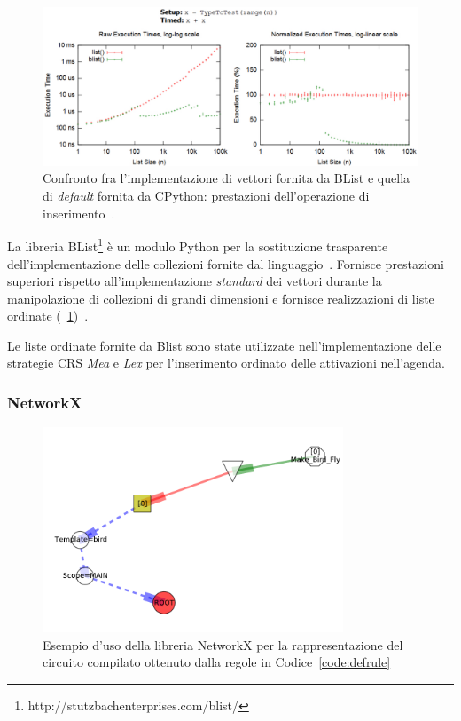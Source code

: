 \begin{figure}[h]
\centering
\includegraphics[width=1\textwidth]{Immagini/Capitolo3/BList-comparison.pdf}
\caption[Confronto fra l'implementazione di vettori fornita da BList e di \emph{default}]{Confronto fra l'implementazione di vettori fornita da BList e quella di \emph{default} fornita da CPython: prestazioni dell'operazione di inserimento~\cite{blist-prest}.}\label{fig:blist-comparison}
\end{figure}

La libreria BList\footnote{http://stutzbachenterprises.com/blist/} è un modulo Python per la sostituzione trasparente dell'implementazione delle collezioni fornite dal linguaggio~\cite{blist-manual}. Fornisce prestazioni superiori rispetto all'implementazione \emph{standard} dei vettori durante la manipolazione di collezioni di grandi dimensioni e fornisce realizzazioni di liste ordinate (\figurename~\ref{fig:blist-comparison})~\cite{blist-prest}.

Le liste ordinate fornite da Blist sono state utilizzate nell'implementazione delle strategie CRS \emph{Mea} e \emph{Lex} per l'inserimento ordinato delle attivazioni nell'agenda.


\subsubsection{NetworkX}

\begin{figure}
\centering
\includegraphics[width=0.8\textwidth]{Immagini/Capitolo3/NetworkX-example.pdf}
\caption[Esempio d'uso della libreria NetworkX]{Esempio d'uso della libreria NetworkX per la rappresentazione del circuito compilato ottenuto dalla regole in Codice~\ref{code:defrule}}\label{fig:networkx-example}
\end{figure}

